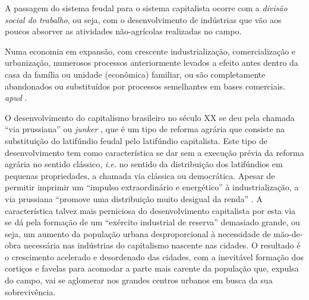 \documentclass[
	12pt,				%
	oneside,			%
	a4paper,			%
	chapter=TITLE,		%
	section=TITLE,		%
	english,			%
	brazil				%
	]{abntex2}
\begin{document}
A passagem do sistema feudal para o sistema capitalista ocorre com a
\emph{divisão social do trabalho}, ou seja, com o desenvolvimento de
indústrias que vão aos poucos absorver as atividades não-agrícolas
realizadas no campo.
\begin{citacao}
Numa economia em expansão, com crescente industrialização, comercialização e
urbanização, numerosos processos anteriormente levados a efeito antes dentro da
casa da família ou unidade (econômica) familiar, ou são completamente
abandonados ou substituídos por processos semelhantes em bases
comerciais. \cite[p. 41]{kuznets} \textit{apud} \cite[p. 218]{rangel1956}.
\end{citacao}
O desenvolvimento do capitalismo brasileiro no século XX se deu pela
chamada ``via prussiana'' ou \emph{junker} \autocite[155]{rangel1988},
que é um tipo de reforma agrária que consiste na substituição do
latifúndio feudal pelo latifúndio capitalista. Este tipo de
desenvolvimento tem como característica se dar sem a execução prévia da
reforma agrária no sentido clássico, \emph{i.e.} no sentido da
distribuição dos latifúndios em pequenas propriedades, a chamada via
clássica ou democrática. Apesar de permitir imprimir um ``impulso
extraordinário e energético'' à industrialização, a via prussiana
``promove uma distribuição muito desigual da renda''
\autocite[155]{rangel1988}. A característica talvez mais perniciosa do
desenvolvimento capitalista por esta via se dá pela formação de um
``exército industrial de reserva'' demasiado grande, ou seja, um aumento
da população urbana desproporcional à necessidade de mão-de-obra
necessária nas indústrias do capitalismo nascente nas cidades. O
resultado é o crescimento acelerado e desordenado das cidades, com a
inevitável formação dos cortiços e favelas para acomodar a parte mais
carente da população que, expulsa do campo, vai se aglomerar nos grandes
centros urbanos em busca da sua sobrevivência.
\end{document}
